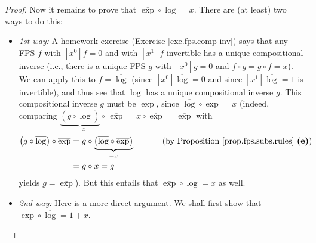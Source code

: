 \begin{proof}
Now it remains to prove that $\overline{\exp}\circ\overline{\log}=x$. There
are (at least) two ways to do this:

\begin{itemize}
\item \textit{1st way:} A homework exercise (Exercise \ref{exe.fps.comp-inv})
says that any FPS $f$ with $\left[  x^{0}\right]  f=0$ and with $\left[
x^{1}\right]  f$ invertible has a unique compositional inverse (i.e., there is
a unique FPS $g$ with $\left[  x^{0}\right]  g=0$ and $f\circ g=g\circ f=x$).
We can apply this to $f=\overline{\log}$ (since $\left[  x^{0}\right]
\overline{\log}=0$ and since $\left[  x^{1}\right]  \overline{\log}=1$ is
invertible), and thus see that $\overline{\log}$ has a unique compositional
inverse $g$. This compositional inverse $g$ must be $\overline{\exp}$, since
$\overline{\log}\circ\overline{\exp}=x$ (indeed, comparing
$\underbrace{\left(  g\circ\overline{\log}\right)  }_{=x}\circ\,\overline
{\exp}=x\circ\overline{\exp}=\overline{\exp}$ with
\begin{align*}
\left(  g\circ\overline{\log}\right)  \circ\overline{\exp}  &  =g\circ
\underbrace{\left(  \overline{\log}\circ\overline{\exp}\right)  }%
_{=x}\ \ \ \ \ \ \ \ \ \ \left(  \text{by Proposition
\ref{prop.fps.subs.rules} \textbf{(e)}}\right) \\
&  =g\circ x=g
\end{align*}
yields $g=\overline{\exp}$). But this entails that $\overline{\exp}%
\circ\overline{\log}=x$ as well.

\item \textit{2nd way:} Here is a more direct argument. We shall first show
that $\exp\circ\overline{\log}=1+x$.


\end{itemize}
\end{proof}
